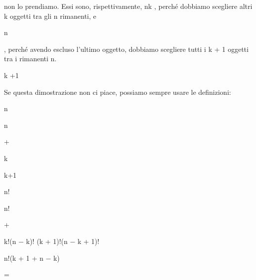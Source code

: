 \documentclass[a4paper,portrait,12pt]{article}
\begin{document}
\begin{flushleft}
non lo prendiamo. Essi sono, rispettivamente, nk , perch\'{e} dobbiamo scegliere altri k oggetti tra gli n rimanenti, e
\end{flushleft}


\begin{flushleft}
n
\end{flushleft}


\begin{flushleft}
, perch\'{e} avendo escluso l'ultimo oggetto, dobbiamo scegliere tutti i k + 1 oggetti tra i rimanenti n.
\end{flushleft}


\begin{flushleft}
k +1
\end{flushleft}


\begin{flushleft}
Se questa dimostrazione non ci piace, possiamo sempre usare le definizioni:
\end{flushleft}


\begin{flushleft}
n
\end{flushleft}


\begin{flushleft}
n
\end{flushleft}


+


\begin{flushleft}
k
\end{flushleft}


\begin{flushleft}
k+1
\end{flushleft}





\begin{flushleft}
n!
\end{flushleft}


\begin{flushleft}
n!
\end{flushleft}


+


\begin{flushleft}
k!(n $-$ k)! (k + 1)!(n $-$ k + 1)!
\end{flushleft}


\begin{flushleft}
n!(k + 1 + n $-$ k)
\end{flushleft}


=
\end{document}
